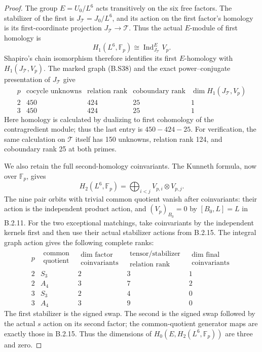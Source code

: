 \begin{proof}
The group $E=U_0/L^6$ acts transitively on the six
free factors.  The stabilizer of the first is
$J_{\mathcal T}=J_0/L^6$, and its action on the first
factor's homology is its first-coordinate projection
$J_{\mathcal T}\to\mathcal T$.  Thus the actual
$E$-module of first homology is
\[
 H_1(L^6,\mathbb F_p)
       \cong\operatorname{Ind}_{J_{\mathcal T}}^E V_p.
                                                                  \tag{B.S40}
\]
Shapiro's chain isomorphism therefore identifies its
first $E$-homology with $H_1(J_{\mathcal T},V_p)$.
The marked graph (B.S38) and the exact power--conjugate
presentation of $J_{\mathcal T}$ give
\[
\begin{array}{c|c|c|c|c}
 p&\text{cocycle unknowns}&\text{relation rank}&
     \text{coboundary rank}&\dim H_1(J_{\mathcal T},V_p)\\ \hline
 2&450&424&25&1\\
 3&450&424&25&1
\end{array}                                                     \tag{B.S41}
\]
Here homology is calculated by dualizing to first
cohomology of the contragredient module; thus the
last entry is $450-424-25$.  For verification, the
same calculation on $\mathcal T$ itself has 150
unknowns, relation rank 124, and coboundary rank 25
at both primes.

We also retain the full second-homology coinvariants.
The Kunneth formula, now over $\mathbb F_p$, gives
\[
 H_2(L^6,\mathbb F_p)
                    =\bigoplus_{i<j} V_{p,i}\otimes V_{p,j}.
\]
The nine pair orbits with trivial common quotient
vanish after coinvariants: their action is the
independent product action, and
$(V_p)_{B_0}=0$ by $[B_0,L]=L$ in B.2.11.
For the two exceptional matchings, take coinvariants
by the independent kernels first and then use their
actual stabilizer actions from B.2.15.  The integral
graph action gives the following complete ranks:
\[
\begin{array}{c|c|c|c|c}
 p&\substack{\text{common}\\\text{quotient}}&
 \substack{\dim\text{ factor}\\\text{coinvariants}}&
 \substack{\text{tensor/stabilizer}\\\text{relation rank}}&
 \substack{\dim\text{ final}\\\text{coinvariants}}\\ \hline
 2&S_3&2&3&1\\
 2&A_4&3&7&2\\
 3&S_3&2&4&0\\
 3&A_4&3&9&0
\end{array}                                                     \tag{B.S42}
\]
The first stabilizer is the signed swap.  The second
is the signed swap followed by the actual $s$ action
on its second factor; the common-quotient generator
maps are exactly those in B.2.15.  Thus the dimensions
of $H_0(E,H_2(L^6,\mathbb F_p))$ are three and zero.


\end{proof}
